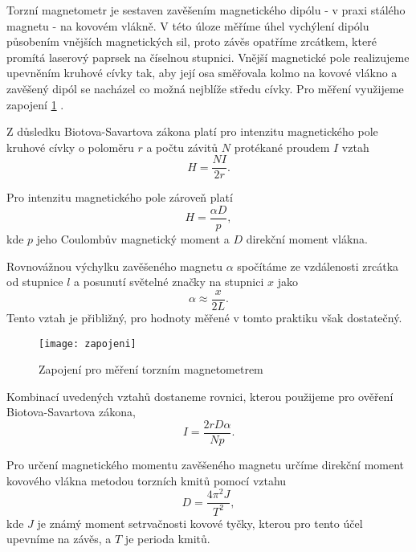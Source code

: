 \documentclass[0-protokol.tex]{subfiles}
\begin{document}
Torzní magnetometr je sestaven zavěšením magnetického dipólu - v praxi stálého magnetu - na kovovém vlákně. V této úloze měříme úhel vychýlení dipólu působením vnějších magnetických sil, proto závěs opatříme zrcátkem, které promítá laserový paprsek na číselnou stupnici. Vnější magnetické pole realizujeme upevněním kruhové cívky tak, aby její osa směřovala kolmo na kovové vlákno a zavěšený dipól se nacházel co možná nejblíže středu cívky. Pro měření využijeme zapojení \ref{fig:zapojeni} \cite{stud_text}.

Z důsledku Biotova-Savartova zákona platí pro intenzitu magnetického pole kruhové cívky o poloměru $r$ a počtu závitů $N$ protékané proudem $I$ vztah 
\begin{equation} \label{eq:H_civky}
H = \frac{NI}{2r}.
\end{equation}

Pro intenzitu magnetického pole zároveň platí 
\begin{equation} \label{eq:H_vychylka}
H = \frac{\alpha D}{p},
\end{equation}
kde $p$ jeho Coulombův magnetický moment a $D$ direkční moment vlákna.

Rovnovážnou výchylku zavěšeného magnetu $\alpha$ spočítáme ze vzdálenosti zrcátka od stupnice $l$ a posunutí světelné značky na stupnici $x$ jako
\begin{equation} \label{eq:alpha}
\alpha \approx \frac{x}{2L}.
\end{equation}
Tento vztah je přibližný, pro hodnoty měřené v tomto praktiku však dostatečný.

\begin{figure}[H]
\centering
\texttt{[image: zapojeni]}
\caption{Zapojení pro měření torzním magnetometrem}
\label{fig:zapojeni}
\end{figure}

Kombinací uvedených vztahů dostaneme rovnici, kterou použijeme pro ověření Biotova-Savartova zákona,
\begin{equation} \label{eq:B-S}
I = \frac{2rD\alpha}{Np}.
\end{equation}

Pro určení magnetického momentu zavěšeného magnetu určíme direkční moment kovového vlákna metodou torzních kmitů pomocí vztahu 
\begin{equation} \label{eq:D}
D = \frac{4\pi^2 J}{T^2},
\end{equation}
kde $J$ je známý moment setrvačnosti kovové tyčky, kterou pro tento účel upevníme na závěs, a $T$ je perioda kmitů.
\end{document}
